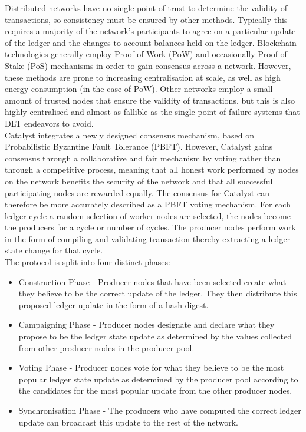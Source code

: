 Distributed networks have no single point of trust to determine the validity of transactions, so consistency must be ensured by other methods. Typically this requires a majority of the network's participants to agree on a particular update of the ledger and the changes to account balances held on the ledger. Blockchain technologies generally employ Proof-of-Work (PoW) and occasionally Proof-of-Stake (PoS) mechanisms in order to gain consensus across a network. However, these methods are prone to increasing centralisation at scale, as well as high energy consumption (in the case of PoW). Other networks employ a small amount of trusted nodes that ensure the validity of transactions, but this is also highly centralised and almost as fallible as the single point of failure systems that DLT endeavors to avoid. \\

Catalyst integrates a newly designed consensus mechanism, based on Probabilistic Byzantine Fault Tolerance (PBFT). However, Catalyst gains consensus through a collaborative and fair mechanism by voting rather than through a competitive process, meaning that all honest work performed by nodes on the network benefits the security of the network and that all successful participating nodes are rewarded equally. The consensus for Catalyst can therefore be more accurately described as a PBFT voting mechanism. For each ledger cycle a random selection of worker nodes are selected, the nodes become the producers for a cycle or number of cycles. The producer nodes perform work in the form of compiling and validating transaction thereby extracting a ledger state change for that cycle. \\

The protocol is split into four distinct phases:

\begin{itemize}

\item Construction Phase - Producer nodes that have been selected create what they believe to be the correct update of the ledger. They then distribute this proposed ledger update in the form of a hash digest.
\item Campaigning Phase - Producer nodes designate and declare what they propose to be the ledger state update as determined by the values collected from other producer nodes in the producer pool.
\item Voting Phase - Producer nodes vote for what they believe to be the most popular ledger state update as determined by the producer pool according to the candidates for the most popular update from the other producer nodes.
\item Synchronisation Phase - The producers who have computed the correct ledger update can broadcast this update to the rest of the network.

\end{itemize}

